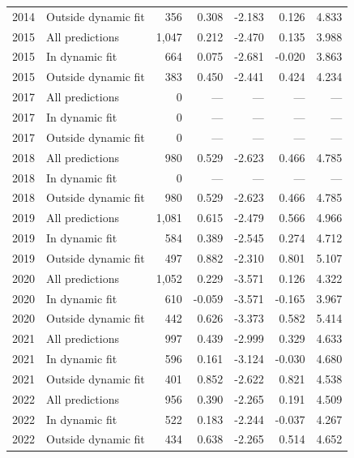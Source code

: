 \begin{longtable}{llrrrrr}
2014 & Outside dynamic fit & 356 & 0.308 & -2.183 & 0.126 & 4.833 \\
2015 & All predictions & 1,047 & 0.212 & -2.470 & 0.135 & 3.988 \\
2015 & In dynamic fit & 664 & 0.075 & -2.681 & -0.020 & 3.863 \\
2015 & Outside dynamic fit & 383 & 0.450 & -2.441 & 0.424 & 4.234 \\
2017 & All predictions & 0 & --- & --- & --- & --- \\
2017 & In dynamic fit & 0 & --- & --- & --- & --- \\
2017 & Outside dynamic fit & 0 & --- & --- & --- & --- \\
2018 & All predictions & 980 & 0.529 & -2.623 & 0.466 & 4.785 \\
2018 & In dynamic fit & 0 & --- & --- & --- & --- \\
2018 & Outside dynamic fit & 980 & 0.529 & -2.623 & 0.466 & 4.785 \\
2019 & All predictions & 1,081 & 0.615 & -2.479 & 0.566 & 4.966 \\
2019 & In dynamic fit & 584 & 0.389 & -2.545 & 0.274 & 4.712 \\
2019 & Outside dynamic fit & 497 & 0.882 & -2.310 & 0.801 & 5.107 \\
2020 & All predictions & 1,052 & 0.229 & -3.571 & 0.126 & 4.322 \\
2020 & In dynamic fit & 610 & -0.059 & -3.571 & -0.165 & 3.967 \\
2020 & Outside dynamic fit & 442 & 0.626 & -3.373 & 0.582 & 5.414 \\
2021 & All predictions & 997 & 0.439 & -2.999 & 0.329 & 4.633 \\
2021 & In dynamic fit & 596 & 0.161 & -3.124 & -0.030 & 4.680 \\
2021 & Outside dynamic fit & 401 & 0.852 & -2.622 & 0.821 & 4.538 \\
2022 & All predictions & 956 & 0.390 & -2.265 & 0.191 & 4.509 \\
2022 & In dynamic fit & 522 & 0.183 & -2.244 & -0.037 & 4.267 \\
2022 & Outside dynamic fit & 434 & 0.638 & -2.265 & 0.514 & 4.652 \\
\end{longtable}
\endgroup
{}

